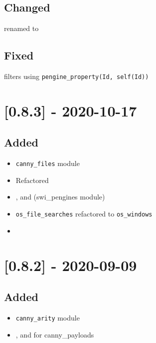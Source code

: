 \subsection{Changed}

\begin{shortlist}
    \item {} renamed to 
\end{shortlist}

\subsection{Fixed}

\begin{shortlist}
    \item {} filters using \verb$pengine_property(Id, self(Id))$
\end{shortlist}

\section{[0.8.3] - 2020-10-17}

\subsection{Added}

\begin{itemize}
    \item \verb$canny_files$ module
    \item Refactored 
    \item {},  and  (swi_pengines module)
    \item \verb$os_file_searches$ refactored to \verb$os_windows$
    \item {}
\end{itemize}

\section{[0.8.2] - 2020-09-09}

\subsection{Added}

\begin{itemize}
    \item \verb$canny_arity$ module
    \item {},  and  for canny_payloads
\end{itemize}

